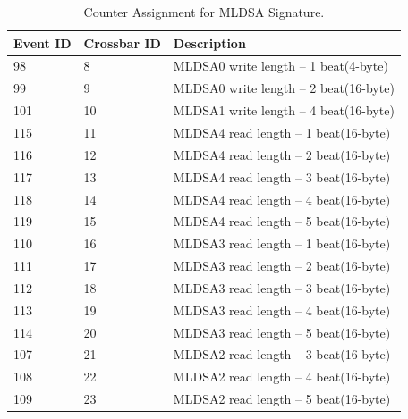 \begin{table}[H]
	\caption{Counter Assignment for MLDSA Signature. }
	\label{table:t_sign}
	\centering
		\begin{tabular}{|l|l|l|}
			\hline
			\textbf{Event ID} & \textbf{Crossbar ID} & \textbf{Description}\\
			\hline

98  & 8  & MLDSA0 write length -- 1 beat(4-byte)  \\
99  & 9  & MLDSA0 write length -- 2 beat(16-byte) \\
101 & 10 & MLDSA1 write length -- 4 beat(16-byte) \\
115 & 11 & MLDSA4 read  length -- 1 beat(16-byte) \\
116 & 12 & MLDSA4 read  length -- 2 beat(16-byte) \\
117 & 13 & MLDSA4 read  length -- 3 beat(16-byte) \\
118 & 14 & MLDSA4 read  length -- 4 beat(16-byte) \\
119 & 15 & MLDSA4 read  length -- 5 beat(16-byte) \\
110 & 16 & MLDSA3 read  length -- 1 beat(16-byte) \\
111 & 17 & MLDSA3 read  length -- 2 beat(16-byte) \\
112 & 18 & MLDSA3 read  length -- 3 beat(16-byte) \\
113 & 19 & MLDSA3 read  length -- 4 beat(16-byte) \\
114 & 20 & MLDSA3 read  length -- 5 beat(16-byte) \\
107 & 21 & MLDSA2 read  length -- 3 beat(16-byte) \\
108 & 22 & MLDSA2 read  length -- 4 beat(16-byte) \\
109 & 23 & MLDSA2 read  length -- 5 beat(16-byte) \\
	\hline
		\end{tabular}
\end{table}
